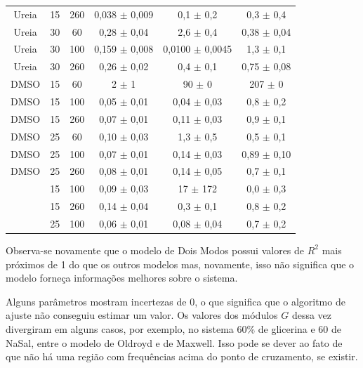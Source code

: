 \begin{table}[h]
{\begin{tabular}{c c c c c c}
				  Ureia   & 15      & 260     & 0,038 \(\pm\) 0,009 & 0,1     \(\pm\)     0,2     & 0,3   \(\pm\)   0,4     \\
				  Ureia   & 30      & 60      & 0,28  \(\pm\) 0,04  & 2,6     \(\pm\)     0,4     & 0,38  \(\pm\)  0,04     \\
				  Ureia   & 30      & 100     & 0,159 \(\pm\) 0,008 & 0,0100  \(\pm\)      0,0045 & 1,3   \(\pm\)    0,1     \\
				  Ureia   & 30      & 260     & 0,26  \(\pm\) 0,02  & 0,4     \(\pm\)     0,1     & 0,75  \(\pm\)  0,08     \\ \midrule
				  DMSO    & 15      & 60      & 2  \(\pm\) 1        & 90      \(\pm\)    0        & 207   \(\pm\)        0     \\
				  DMSO    & 15      & 100     & 0,05  \(\pm\) 0,01  & 0,04    \(\pm\) 0,03        & 0,8   \(\pm\)       0,2  \\
				  DMSO    & 15      & 260     & 0,07  \(\pm\) 0,01  & 0,11    \(\pm\) 0,03        & 0,9   \(\pm\)       0,1  \\
				  DMSO    & 25      & 60      & 0,10  \(\pm\) 0,03  & 1,3     \(\pm\)     0,5     & 0,5   \(\pm\)    0,1     \\
				  DMSO    & 25      & 100     & 0,07  \(\pm\) 0,01  & 0,14    \(\pm\) 0,03        & 0,89  \(\pm\)       0,10 \\
				  DMSO    & 25      & 260     & 0,08  \(\pm\) 0,01  & 0,14    \(\pm\) 0,05        & 0,7   \(\pm\)       0,1  \\
				  \BD{}    & 15      & 100     & 0,09  \(\pm\) 0,03  & 17      \(\pm\)     172     & 0,0   \(\pm\)       0,3  \\
				  \BD{}    & 15      & 260     & 0,14  \(\pm\) 0,04  & 0,3     \(\pm\)     0,1     & 0,8   \(\pm\)    0,2     \\
				  \BD{}    & 25      & 100     & 0,06  \(\pm\) 0,01  & 0,08    \(\pm\) 0,04        & 0,7   \(\pm\)       0,2  \\ \bottomrule
			\end{tabular} 
		}{} 
\end{table} 

		\FloatBarrier
		
		Observa-se novamente que o modelo de Dois Modos possui valores de \(R^2\) mais próximos de 1 do que os outros modelos mas, novamente, isso não significa que o modelo forneça informações melhores sobre o sistema.
		
		Alguns parâmetros mostram incertezas de 0, o que significa que o algoritmo de ajuste não conseguiu estimar um valor. Os valores dos módulos \(G\) dessa vez divergiram em alguns casos, por exemplo, no sistema 60\% de glicerina e 60 \mM{} de NaSal, entre o modelo de Oldroyd e de Maxwell. Isso pode se dever ao fato de que não há uma região com frequências acima do ponto de cruzamento, se existir.
		
